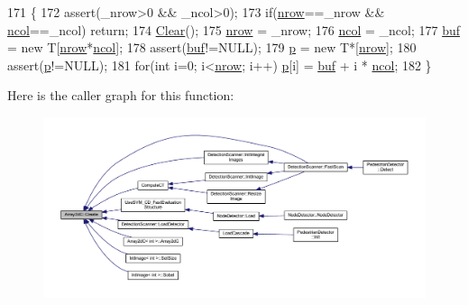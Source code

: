 \begin{DoxyCode}
171 \{
172     assert(\_nrow>0 && \_ncol>0);
173     \textcolor{keywordflow}{if}(\mbox{\hyperlink{class_array2d_c_a12f690f7195f7674a86a7e1eedbc473c}{nrow}}==\_nrow && \mbox{\hyperlink{class_array2d_c_a27e0f8f40f644831cd7c750db59dc28a}{ncol}}==\_ncol) \textcolor{keywordflow}{return};
174     \mbox{\hyperlink{class_array2d_c_a76a406cfeb9a9f75a1586e0a7b22f63e}{Clear}}();
175     \mbox{\hyperlink{class_array2d_c_a12f690f7195f7674a86a7e1eedbc473c}{nrow}} = \_nrow;
176     \mbox{\hyperlink{class_array2d_c_a27e0f8f40f644831cd7c750db59dc28a}{ncol}} = \_ncol;
177     \mbox{\hyperlink{class_array2d_c_a25d8fa5049d4c7ded126e0acdd18f37a}{buf}} = \textcolor{keyword}{new} T[\mbox{\hyperlink{class_array2d_c_a12f690f7195f7674a86a7e1eedbc473c}{nrow}}*\mbox{\hyperlink{class_array2d_c_a27e0f8f40f644831cd7c750db59dc28a}{ncol}}];
178     assert(\mbox{\hyperlink{class_array2d_c_a25d8fa5049d4c7ded126e0acdd18f37a}{buf}}!=NULL);
179     \mbox{\hyperlink{class_array2d_c_a727eae5d663d463635cc150e6f771f0d}{p}} = \textcolor{keyword}{new} T*[\mbox{\hyperlink{class_array2d_c_a12f690f7195f7674a86a7e1eedbc473c}{nrow}}];
180     assert(\mbox{\hyperlink{class_array2d_c_a727eae5d663d463635cc150e6f771f0d}{p}}!=NULL);
181     \textcolor{keywordflow}{for}(\textcolor{keywordtype}{int} i=0; i<\mbox{\hyperlink{class_array2d_c_a12f690f7195f7674a86a7e1eedbc473c}{nrow}}; i++) \mbox{\hyperlink{class_array2d_c_a727eae5d663d463635cc150e6f771f0d}{p}}[i] = \mbox{\hyperlink{class_array2d_c_a25d8fa5049d4c7ded126e0acdd18f37a}{buf}} + i * \mbox{\hyperlink{class_array2d_c_a27e0f8f40f644831cd7c750db59dc28a}{ncol}};
182 \}
\end{DoxyCode}
Here is the caller graph for this function\+:
\nopagebreak
\begin{figure}[H]
\begin{center}
\leavevmode
\includegraphics[width=350pt]{class_array2d_c_abfe87be7641dfc586b9e7bffebcca9ec_icgraph}
\end{center}
\end{figure}
\mbox{\label{class_int_image_a9e74890b8f45d03e0c4aa335a96849d1}} 
